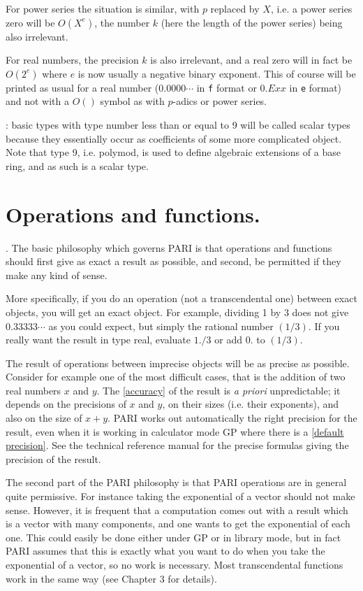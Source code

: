 For power series the situation is similar, with $p$ replaced
by $X$, i.e. a power series zero will be $O(X^e)$, the number $k$ (here the
length of the power series) being also irrelevant.

For real numbers, the precision $k$ is also irrelevant,
and a real zero will in fact be $O(2^e)$ where $e$ is now usually a
negative binary exponent. This of course will be printed as usual for
a real number ($0.0000\cdots$ in {\tt f} format or $0.Exx$ in {\tt e} format)
and not with a $O()$ symbol as with $p$-adics or power series.

: basic types with type number less than or equal
to 9 will be called scalar types because they essentially occur as
coefficients of some more complicated object. Note that type 9, i.e. polymod,
is used to define algebraic extensions of a base ring, and as such is
a scalar type.

\section{Operations and functions.}

.
The basic philosophy which governs PARI is that operations and functions
should first give as exact a result as possible, and second, be permitted
if they make any kind of sense.

More specifically, if you do an operation (not a transcendental one)
between exact objects, you will get an exact object. For example,
dividing 1 by 3 does not give $0.33333\cdots$ as you could expect,
but simply the rational number $(1/3)$. If you really want the result
in type real, evaluate $1./3$ or add $0.$ to $(1/3)$.

The result of operations between imprecise objects will be as precise
as possible. Consider for example one of the most difficult cases, that is
the addition of two real numbers $x$ and $y$. The \ref{accuracy} of the result is
{\it a priori\/} unpredictable; it depends on the precisions of $x$ and $y$, on
their sizes (i.e. their exponents), and also on the size of $x+y$. PARI
works out automatically the right precision for the result, even when it
is working in calculator mode GP where there is a \ref{default precision}.
See the technical reference manual for the precise formulas giving the
precision of the result.

The second part of the PARI philosophy is that PARI operations are in
general quite permissive. For instance taking the exponential of a vector
should not make sense. However, it is frequent that a computation comes
out with a result which is a vector with many components, and one wants
to get the exponential of each one. This could easily be done
either under GP or in library mode, but in fact PARI assumes
that this is exactly what you want to do when you take the exponential of a
vector, so no work is necessary. Most transcendental functions work in the
same way (see Chapter 3 for details).

